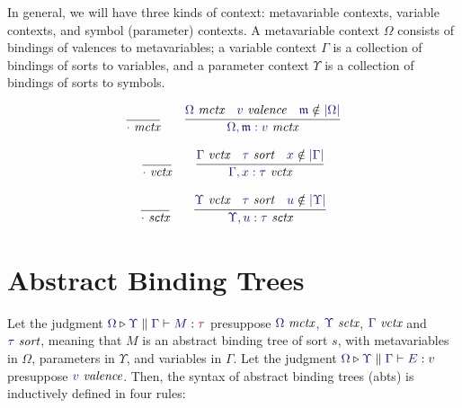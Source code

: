 \documentclass[11pt]{article}
\theoremstyle{definition}
\theoremstyle{remark}
\numberwithin{equation}{section}
\def\IModeColorName{MidnightBlue}
\def\OModeColorName{Maroon}
\newcommand\IMode[1]{{\color{\IModeColorName}{#1}}}
\newcommand\OMode[1]{{\color{\OModeColorName}{#1}}}
\newcommand\IsValence[1]{\IMode{#1}\ \textit{valence}}
\newcommand\IsSort[1]{\IMode{#1}\ \textit{sort}}
\newcommand\IsMetaCtx[1]{\IMode{#1}\ \textit{mctx}}
\newcommand\IsVarCtx[1]{\IMode{#1}\ \textit{vctx}}
\newcommand\IsSymCtx[1]{\IMode{#1}\ \textit{sctx}}
\newcommand\IsAbt[5]{%
  \IMode{#1}\triangleright%
  \IMode{#2}\parallel%
  \IMode{#3}\vdash%
  \IMode{#4}:\OMode{#5}%
}
\newcommand\IsBTm[5]{%
  \IMode{#1}\triangleright%
  \IMode{#2}\parallel%
  \IMode{#3}\vdash%
  \IMode{#4}:\IMode{#5}%
}
\newcommand\MV[1]{\mathfrak{#1}}
\newcommand\Dom[1]{\left\vert#1\right\vert}
\newcommand\NotIn[2]{\IMode{#1}\notin\IMode{#2}}
\begin{document}
In general, we will have three kinds of context: metavariable contexts,
variable contexts, and symbol (parameter) contexts. A metavariable context
$\Omega$ consists of bindings of valences to metavariables; a variable context
$\Gamma$ is a collection of bindings of sorts to variables, and a parameter
context $\Upsilon$ is a collection of bindings of sorts to symbols.

\begin{gather*}
  \infer{
    \IsMetaCtx{\cdot}
  }{
  }\qquad
  \infer{
    \IsMetaCtx{\Omega,\MV{m}:v}
  }{
    \IsMetaCtx{\Omega} &
    \IsValence{v} &
    \NotIn{\MV{m}}{\Dom\Omega}
  }
\end{gather*}

\begin{gather*}
  \infer{
    \IsVarCtx{\cdot}
  }{
  }\qquad
  \infer{
    \IsVarCtx{\Gamma,x:\tau}
  }{
    \IsVarCtx{\Gamma} &
    \IsSort{\tau} &
    \NotIn{x}{\Dom\Gamma}
  }
\end{gather*}

\begin{gather*}
  \infer{
    \IsSymCtx{\cdot}
  }{
  }\qquad
  \infer{
    \IsSymCtx{\Upsilon,u:\tau}
  }{
    \IsVarCtx{\Upsilon} &
    \IsSort{\tau} &
    \NotIn{u}{\Dom\Upsilon}
  }
\end{gather*}

\section{Abstract Binding Trees}

Let the judgment $\IsAbt{\Omega}{\Upsilon}{\Gamma}{M}{\tau}$ presuppose
$\IsMetaCtx{\Omega}$, $\IsSymCtx\Upsilon$, $\IsVarCtx\Gamma$ and $\IsSort{\tau}$,
meaning that $M$ is an abstract binding tree of sort $s$, with metavariables in
$\Omega$, parameters in $\Upsilon$, and variables in $\Gamma$. Let the judgment
$\IsBTm{\Omega}{\Upsilon}{\Gamma}{E}{v}$ presuppose $\IsValence{v}$.  Then, the
syntax of abstract binding trees (abts) is inductively defined in four rules:
\end{document}
